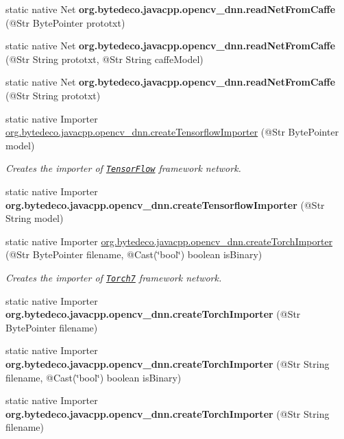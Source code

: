 \begin{DoxyCompactItemize}
static native Net {\bfseries org.\+bytedeco.\+javacpp.\+opencv\+\_\+dnn.\+read\+Net\+From\+Caffe} (@Str Byte\+Pointer prototxt)
\item 
\mbox{\label{group__dnn_ga27a10c9613593148cc9829d71b9750d4}} 
static native Net {\bfseries org.\+bytedeco.\+javacpp.\+opencv\+\_\+dnn.\+read\+Net\+From\+Caffe} (@Str String prototxt, @Str String caffe\+Model)
\item 
\mbox{\label{group__dnn_gad373a5c31881fed711e43dc98f47edf8}} 
static native Net {\bfseries org.\+bytedeco.\+javacpp.\+opencv\+\_\+dnn.\+read\+Net\+From\+Caffe} (@Str String prototxt)
\item 
static native Importer \hyperlink{group__dnn_gafb21a0aa44b3feb934bcd5ad4fc708e3}{org.\+bytedeco.\+javacpp.\+opencv\+\_\+dnn.\+create\+Tensorflow\+Importer} (@Str Byte\+Pointer model)
\begin{DoxyCompactList}\small\item\em Creates the importer of \href{http://www.tensorflow.org}{\tt Tensor\+Flow} framework network. \end{DoxyCompactList}\item 
\mbox{\label{group__dnn_gaf66d96c7663a28da29f000e0f5ce779e}} 
static native Importer {\bfseries org.\+bytedeco.\+javacpp.\+opencv\+\_\+dnn.\+create\+Tensorflow\+Importer} (@Str String model)
\item 
static native Importer \hyperlink{group__dnn_gae0f202e183aadc4ec86abda60b0e6adf}{org.\+bytedeco.\+javacpp.\+opencv\+\_\+dnn.\+create\+Torch\+Importer} (@Str Byte\+Pointer filename, @Cast(\char`\"{}bool\char`\"{}) boolean is\+Binary)
\begin{DoxyCompactList}\small\item\em Creates the importer of \href{http://torch.ch}{\tt Torch7} framework network. \end{DoxyCompactList}\item 
\mbox{\label{group__dnn_ga65445a91ded9caf02fedcfe28cd4b01f}} 
static native Importer {\bfseries org.\+bytedeco.\+javacpp.\+opencv\+\_\+dnn.\+create\+Torch\+Importer} (@Str Byte\+Pointer filename)
\item 
\mbox{\label{group__dnn_ga30d594ccb5ccdbcb60408c0070961654}} 
static native Importer {\bfseries org.\+bytedeco.\+javacpp.\+opencv\+\_\+dnn.\+create\+Torch\+Importer} (@Str String filename, @Cast(\char`\"{}bool\char`\"{}) boolean is\+Binary)
\item 
\mbox{\label{group__dnn_ga7c73f5cf884abee9684c119e0b96b594}} 
static native Importer {\bfseries org.\+bytedeco.\+javacpp.\+opencv\+\_\+dnn.\+create\+Torch\+Importer} (@Str String filename)
\end{DoxyCompactItemize}


